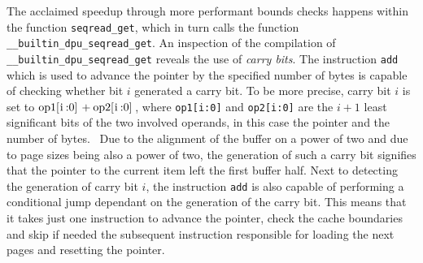 The acclaimed speedup through more performant bounds checks happens within the function \lstinline|seqread_get|, which in turn calls the function \lstinline|__builtin_dpu_seqread_get|.
An inspection of the compilation of \lstinline|__builtin_dpu_seqread_get| reveals the use of \emph{carry bits}.
The instruction \lstinline|add| which is used to advance the pointer by the specified number of bytes is capable of checking whether bit \(i\) generated a carry bit.
To be more precise, carry bit \(i\) is set to \(\text{\lstinline|op1[i:0]|} + \text{\lstinline|op2[i:0]|}\), where \lstinline|op1[i:0]| and \lstinline|op2[i:0]| are the \(i + 1\) least significant bits of the two involved operands, in this case the pointer and the number of bytes.~\cite[DPU Handbook -- Specific Conditions Common To Addition and Subtraction]{upmemSDK}
Due to the alignment of the buffer on a power of two and due to page sizes being also a power of two, the generation of such a carry bit signifies that the pointer to the current item left the first buffer half.
Next to detecting the generation of carry bit \(i\), the instruction \lstinline|add| is also capable of performing a conditional jump dependant on the generation of the carry bit.
This means that it takes just one instruction to advance the pointer, check the cache boundaries and skip \Dash if needed \Dash the subsequent instruction responsible for loading the next pages and resetting the pointer.
